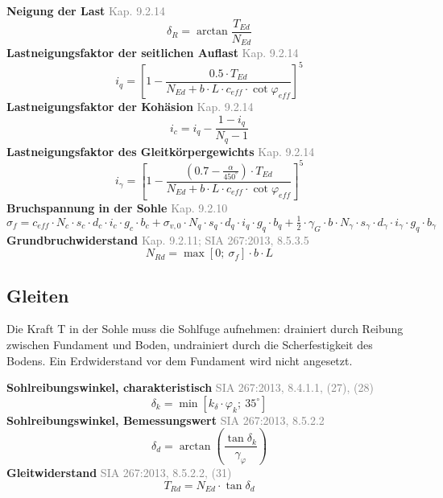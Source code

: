 \documentclass[11pt,a4paper]{article}
\newcommand{\normref}[1]{{\small\textcolor{gray}{#1}}}
\begin{document}
\noindent\textbf{Neigung der Last} \hfill \normref{Kap. 9.2.14}
\begin{equation*}
\delta_R = \arctan\frac{T_{Ed}}{N_{Ed}}
\end{equation*}
\noindent\textbf{Lastneigungsfaktor der seitlichen Auflast} \hfill \normref{Kap. 9.2.14}
\begin{equation*}
i_q = \left[1 - \frac{0.5 \cdot T_{Ed}}{N_{Ed} + b \cdot L \cdot c_{eff} \cdot \cot \varphi_{eff}}\right]^{5}
\end{equation*}
\noindent\textbf{Lastneigungsfaktor der Kohäsion} \hfill \normref{Kap. 9.2.14}
\begin{equation*}
i_c = i_q - \frac{1 - i_q}{N_q - 1}
\end{equation*}
\noindent\textbf{Lastneigungsfaktor des Gleitkörpergewichts} \hfill \normref{Kap. 9.2.14}
\begin{equation*}
i_{\gamma} = \left[1 - \frac{\left(0.7 - \frac{\alpha}{450^\circ}\right) \cdot T_{Ed}}{N_{Ed} + b \cdot L \cdot c_{eff} \cdot \cot \varphi_{eff}}\right]^{5}
\end{equation*}
\noindent\textbf{Bruchspannung in der Sohle} \hfill \normref{Kap. 9.2.10}
\begin{equation*}
\sigma_f = c_{eff} \cdot N_c \cdot s_c \cdot d_c \cdot i_c \cdot g_c \cdot b_c + \sigma_{v,0} \cdot N_q \cdot s_q \cdot d_q \cdot i_q \cdot g_q \cdot b_q + \tfrac{1}{2} \cdot \gamma_G \cdot b \cdot N_{\gamma} \cdot s_{\gamma} \cdot d_{\gamma} \cdot i_{\gamma} \cdot g_q \cdot b_{\gamma}
\end{equation*}
\noindent\textbf{Grundbruchwiderstand} \hfill \normref{Kap. 9.2.11; SIA 267:2013, 8.5.3.5}
\begin{equation*}
N_{Rd} = \max\left[0;\ \sigma_f\right] \cdot b \cdot L
\end{equation*}
\subsection{Gleiten}
Die Kraft T in der Sohle muss die Sohlfuge aufnehmen: drainiert durch Reibung zwischen Fundament und Boden, undrainiert durch die Scherfestigkeit des Bodens. Ein Erdwiderstand vor dem Fundament wird nicht angesetzt.

\noindent\textbf{Sohlreibungswinkel, charakteristisch} \hfill \normref{SIA 267:2013, 8.4.1.1, (27), (28)}
\begin{equation*}
\delta_k = \min\left[k_{\delta} \cdot \varphi_k;\ 35^\circ\right]
\end{equation*}
\noindent\textbf{Sohlreibungswinkel, Bemessungswert} \hfill \normref{SIA 267:2013, 8.5.2.2}
\begin{equation*}
\delta_d = \arctan\left(\frac{\tan \delta_k}{\gamma_{\varphi}}\right)
\end{equation*}
\noindent\textbf{Gleitwiderstand} \hfill \normref{SIA 267:2013, 8.5.2.2, (31)}
\begin{equation*}
T_{Rd} = N_{Ed} \cdot \tan \delta_d
\end{equation*}
\end{document}
